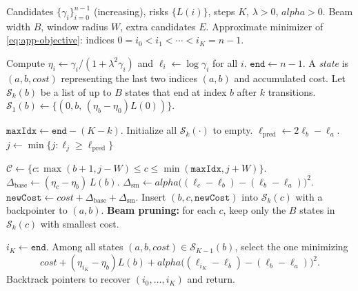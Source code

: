 \documentclass[11pt]{article}
\def\alpha{alpha}%
\theoremstyle{definition}
\numberwithin{equation}{section}
\begin{document}
\begin{algorithm}[tb]
\caption{Heuristic schedule optimization for $\alpha>0$ (beam-pruned windowed DP)}
\label{alg:dp-heuristic-alphapos}
\begin{algorithmic}[1]
\REQUIRE Candidates $\{\gamma_i\}_{i=0}^{n-1}$ (increasing), risks $\{L(i)\}$, steps $K$, $\lambda>0$, $\alpha>0$.
\REQUIRE Beam width $B$, window radius $W$, extra candidates $E$.
\ENSURE Approximate minimizer of \eqref{eq:app-objective}: indices $0=i_0<i_1<\cdots<i_K=n-1$.

\STATE Compute $\eta_i \leftarrow \gamma_i/(1+\lambda^2\gamma_i)$ and $\ell_i \leftarrow \log\gamma_i$ for all $i$.
\STATE $\texttt{end}\leftarrow n-1$.
\STATE A \emph{state} is $(a,b,cost)$ representing the last two indices $(a,b)$ and accumulated cost.
\STATE Let $\mathcal{S}_k(b)$ be a list of up to $B$ states that end at index $b$ after $k$ transitions.
  \STATE $\mathcal{S}_1(b) \leftarrow \{(0,b,\,(\eta_b-\eta_0)L(0))\}$.
\ENDFOR


  \STATE $\texttt{maxIdx} \leftarrow \texttt{end}-(K-k)$.
  \STATE Initialize all $\mathcal{S}_k(\cdot)$ to empty.
      \STATE $\ell_{\mathrm{pred}} \leftarrow 2\ell_b-\ell_a$.
      \STATE $j \leftarrow \min\{j:\ell_j \ge \ell_{\mathrm{pred}}\}$

      \STATE $\mathcal{C} \leftarrow \{c:\max(b{+}1,j{-}W)\le c\le \min(\texttt{maxIdx},j{+}W)\}$.
        \STATE $\Delta_{\mathrm{base}} \leftarrow (\eta_c-\eta_b)\,L(b)$.
        \STATE $\Delta_{\mathrm{sm}} \leftarrow \alpha\Big((\ell_c-\ell_b)-(\ell_b-\ell_a)\Big)^2$.
        \STATE $\texttt{newCost} \leftarrow cost + \Delta_{\mathrm{base}} + \Delta_{\mathrm{sm}}$.
        \STATE Insert $(b,c,\texttt{newCost})$ into $\mathcal{S}_k(c)$ with a backpointer to $(a,b)$.
      \ENDFOR
    \ENDFOR
  \ENDFOR
  \STATE \textbf{Beam pruning:} for each $c$, keep only the $B$ states in $\mathcal{S}_k(c)$ with smallest cost.
\ENDFOR


\STATE $i_K \leftarrow \texttt{end}$.
\STATE Among all states $(a,b,cost)\in \mathcal{S}_{K-1}(b)$, select the one minimizing
\[
cost + (\eta_{i_K}-\eta_b)L(b) + \alpha\Big((\ell_{i_K}-\ell_b)-(\ell_b-\ell_a)\Big)^2 .
\]
\STATE Backtrack pointers to recover $(i_0,\dots,i_K)$ and return.
\end{algorithmic}
\end{algorithm}
\end{document}
